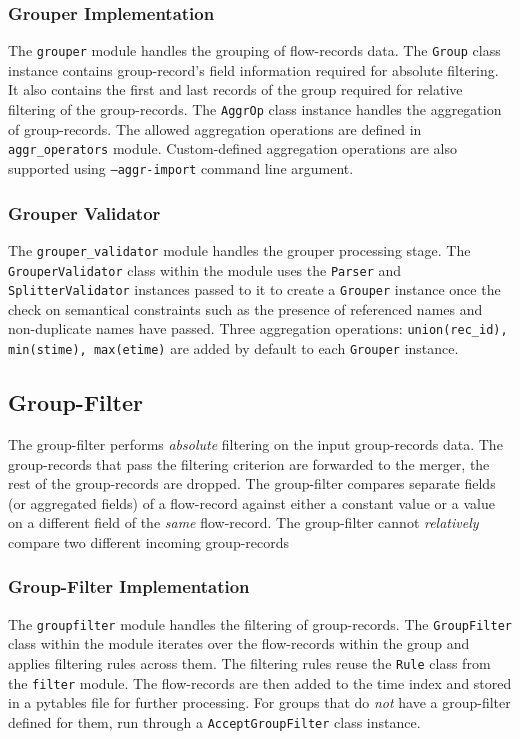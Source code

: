 \subsubsection{Grouper Implementation}\label{subsubsec:grouper-impl}
The \texttt{grouper} module handles the grouping of flow-records data. The \texttt{Group} class instance contains group-record's field information required for absolute filtering. It also contains the first and last records of the group required for relative filtering of the group-records. The \texttt{AggrOp} class instance handles the aggregation of group-records. The allowed aggregation operations are defined in \texttt{aggr\_operators} module. Custom-defined aggregation operations are also supported using \texttt{--aggr-import} command line argument.

\subsubsection{Grouper Validator}\label{subsubsec:grouper-validator}
The \texttt{grouper\_validator} module handles the grouper processing stage.
The \texttt{GrouperValidator} class within the module uses the \texttt{Parser} and \texttt{SplitterValidator} instances passed to it to create a \texttt{Grouper} instance once the check on semantical constraints such as the presence of referenced names and non-duplicate names have passed. Three aggregation operations: \texttt{union(rec\_id), min(stime), max(etime)} are added by default to each \texttt{Grouper} instance.

\subsection{Group-Filter}\label{subsec:group-filter}
The group-filter performs \emph{absolute} filtering on the input group-records data. The group-records that pass the filtering criterion are forwarded to the merger, the rest of the group-records are dropped. The group-filter compares separate fields (or aggregated fields) of a flow-record against either a constant value or a value on a different field of the \emph{same} flow-record. The group-filter cannot \emph{relatively} compare two different incoming group-records

\subsubsection{Group-Filter Implementation}\label{subsubsec:group-filter-impl}
The \texttt{groupfilter} module handles the filtering of group-records. The \texttt{GroupFilter} class within the module iterates over the flow-records within the group and applies filtering rules across them. The filtering rules reuse the \texttt{Rule} class from the \texttt{filter} module. The flow-records are then added to the time index and stored in a pytables file for further processing. For groups that do \emph{not} have a group-filter defined for them, run through a \texttt{AcceptGroupFilter} class instance.

